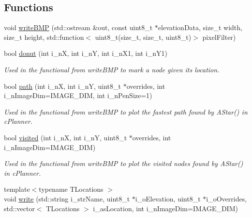 \subsection*{Functions}
\begin{DoxyCompactItemize}
\item 
void \mbox{\hyperlink{namespacevisualizer_ab4e649cd7413a51ac1ae4b31a2994c3a}{write\+B\+MP}} (std\+::ostream \&out, const uint8\+\_\+t $\ast$elevation\+Data, size\+\_\+t width, size\+\_\+t height, std\+::function$<$ uint8\+\_\+t(size\+\_\+t, size\+\_\+t, uint8\+\_\+t)$>$ pixel\+Filter)
\item 
\mbox{\label{namespacevisualizer_a7ff2fee7ef1cf41bc0f273d730f38abc}} 
bool \mbox{\hyperlink{namespacevisualizer_a7ff2fee7ef1cf41bc0f273d730f38abc}{donut}} (int i\+\_\+nX, int i\+\_\+nY, int i\+\_\+n\+X1, int i\+\_\+n\+Y1)
\begin{DoxyCompactList}\small\item\em Used in the functional from write\+B\+MP to mark a node given its location. \end{DoxyCompactList}\item 
\mbox{\label{namespacevisualizer_a12c362482021eed2a592a9d0254e0ab6}} 
bool \mbox{\hyperlink{namespacevisualizer_a12c362482021eed2a592a9d0254e0ab6}{path}} (int i\+\_\+nX, int i\+\_\+nY, uint8\+\_\+t $\ast$overrides, int i\+\_\+n\+Image\+Dim=I\+M\+A\+G\+E\+\_\+\+D\+IM, int i\+\_\+n\+Pen\+Size=1)
\begin{DoxyCompactList}\small\item\em Used in the functional from write\+B\+MP to plot the fastest path found by A\+Star() in c\+Planner. \end{DoxyCompactList}\item 
\mbox{\label{namespacevisualizer_a147374664b0a7e0a40cae2435d9eab5e}} 
bool \mbox{\hyperlink{namespacevisualizer_a147374664b0a7e0a40cae2435d9eab5e}{visited}} (int i\+\_\+nX, int i\+\_\+nY, uint8\+\_\+t $\ast$overrides, int i\+\_\+n\+Image\+Dim=I\+M\+A\+G\+E\+\_\+\+D\+IM)
\begin{DoxyCompactList}\small\item\em Used in the functional from write\+B\+MP to plot the visited nodes found by A\+Star() in c\+Planner. \end{DoxyCompactList}\item 
{\footnotesize template$<$typename T\+Locations $>$ }\\void \mbox{\hyperlink{namespacevisualizer_addbe7459069b4e845756152e1804ca76}{write}} (std\+::string i\+\_\+str\+Name, uint8\+\_\+t $\ast$i\+\_\+o\+Elevation, uint8\+\_\+t $\ast$i\+\_\+o\+Overrides, std\+::vector$<$ T\+Locations $>$ i\+\_\+as\+Location, int i\+\_\+n\+Image\+Dim=I\+M\+A\+G\+E\+\_\+\+D\+IM)

\end{DoxyCompactItemize}
